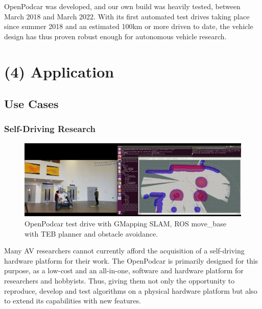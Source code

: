 \documentclass[a4paper]{article}
\begin{document}
	OpenPodcar was developed, and our own build was heavily tested, between March 2018 and March 2022. With its first automated test drives taking place since summer 2018 and an estimated 100km or more driven to date, the vehicle design has thus proven robust enough for autonomous vehicle research. 
	
	
	\section{(4) Application}\label{h.f78bi3oom0mu}
	
	\subsection{Use Cases}
	
	\subsubsection{Self-Driving  Research}\label{h.4q5g9edishy3}
	
	\begin{figure}
		\centering
		\includegraphics[width=\columnwidth]{software/move_base_collision_avoidance.png}
		\caption{OpenPodcar test drive with GMapping SLAM, ROS move\_base with TEB planner and obstacle avoidance.}
		\label{fig:testDrive_gmapping}
	\end{figure}
	
	Many AV researchers cannot currently afford the acquisition of a self-driving hardware platform for their work. The OpenPodcar is primarily designed for this purpose, as a low-cost and an all-in-one, software and hardware platform for researchers and hobbyists. Thus, giving them not only the opportunity to reproduce, develop and test algorithms on a physical hardware platform but also to extend its capabilities with new features. 
	
\end{document}
